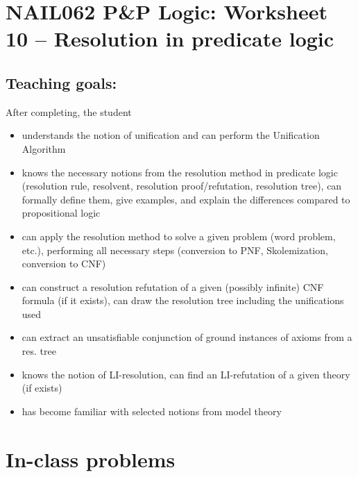 \section*{NAIL062 P\&P Logic: Worksheet 10 -- Resolution in predicate logic}


\subsection*{Teaching goals:} After completing, the student

    \begin{itemize}\setlength{\itemsep}{0pt}
        \item understands the notion of unification and can perform the Unification Algorithm
        \item knows the necessary notions from the resolution method in predicate logic (resolution rule, resolvent, resolution proof/refutation, resolution tree), can formally define them, give examples, and explain the differences compared to propositional logic
        \item can apply the resolution method to solve a given problem (word problem, etc.), performing all necessary steps (conversion to PNF, Skolemization, conversion to CNF)
        \item can construct a resolution refutation of a given (possibly infinite) CNF formula (if it exists), can draw the resolution tree including the unifications used
        \item can extract an unsatisfiable conjunction of ground instances of axioms from a res. tree
        \item knows the notion of LI-resolution, can find an LI-refutation of a given theory (if exists)
        \item has become familiar with selected notions from model theory
    \end{itemize}
    

\section*{In-class problems}


